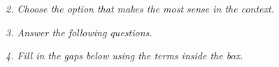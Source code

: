 \documentclass{exam}
\begin{document}
\noindent \textit{2. Choose the option that makes the most sense in the context.}

%
%
%
%
%
%
%
%
%
%
%
%
%
%
%
%
%
%
%
%

\noindent \textit{3. Answer the following questions.}

%
%
%
%
%
%
%
%
%
%
%
%
%
%
%
%
%
%
%
%

\noindent \textit{4. Fill in the gaps below using the terms inside the box.}

%
%
%
%
%
%
%
%
%
%
%
%
%
%
%
%
%
%
%
%
\end{document}
